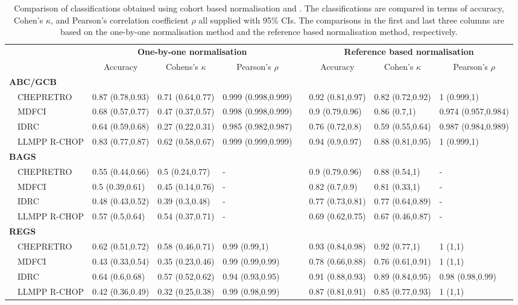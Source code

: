 
\begin{table}[!tbp]
\scriptsize
\tabcolsep=0.11cm
\caption{Comparison of classifications obtained using cohort based normalisation and \hemaClass{}.
The classifications are compared in terms of accuracy, Cohen's $\kappa$, and Pearson's correlation coefficient $\rho$ all supplied with 95\% CIs.
The comparisons in the first and last three columns are based on the one-by-one normalisation method and the reference based normalisation method, respectively.\label{tab:classALL}}
\begin{center}
\begin{tabular}{llllclll}
\hline\hline
\multicolumn{1}{l}{\bfseries }&\multicolumn{3}{c}{\bfseries One-by-one normalisation}&\multicolumn{1}{c}{\bfseries }&\multicolumn{3}{c}{\bfseries Reference based normalisation}\tabularnewline
\cline{2-4} \cline{6-8}
\multicolumn{1}{l}{}&\multicolumn{1}{c}{Accuracy}&\multicolumn{1}{c}{Cohens's $\kappa$}&\multicolumn{1}{c}{Pearson's $\rho$}&\multicolumn{1}{c}{}&\multicolumn{1}{c}{Accuracy}&\multicolumn{1}{c}{Cohen's $\kappa$}&\multicolumn{1}{c}{Pearson's $\rho$}\tabularnewline
\hline
{\bfseries ABC/GCB}&&&&&&&\tabularnewline
~~CHEPRETRO&0.87 (0.78,0.93)&0.71 (0.64,0.77)&0.999 (0.998,0.999)&&0.92 (0.81,0.97)&0.82 (0.72,0.92)&1 (0.999,1)\tabularnewline
~~MDFCI&0.68 (0.57,0.77)&0.47 (0.37,0.57)&0.998 (0.998,0.999)&&0.9 (0.79,0.96)&0.86 (0.7,1)&0.974 (0.957,0.984)\tabularnewline
~~IDRC&0.64 (0.59,0.68)&0.27 (0.22,0.31)&0.985 (0.982,0.987)&&0.76 (0.72,0.8)&0.59 (0.55,0.64)&0.987 (0.984,0.989)\tabularnewline
~~LLMPP R-CHOP&0.83 (0.77,0.87)&0.62 (0.58,0.67)&0.999 (0.999,0.999)&&0.94 (0.9,0.97)&0.88 (0.81,0.95)&1 (0.999,1)\tabularnewline
\hline
{\bfseries BAGS}&&&&&&&\tabularnewline
~~CHEPRETRO&0.55 (0.44,0.66)&0.5 (0.24,0.77)&-&&0.9 (0.79,0.96)&0.88 (0.54,1)&-\tabularnewline
~~MDFCI&0.5 (0.39,0.61)&0.45 (0.14,0.76)&-&&0.82 (0.7,0.9)&0.81 (0.33,1)&-\tabularnewline
~~IDRC&0.48 (0.43,0.52)&0.39 (0.3,0.48)&-&&0.77 (0.73,0.81)&0.77 (0.64,0.89)&-\tabularnewline
~~LLMPP R-CHOP&0.57 (0.5,0.64)&0.54 (0.37,0.71)&-&&0.69 (0.62,0.75)&0.67 (0.46,0.87)&-\tabularnewline
\hline
{\bfseries REGS}&&&&&&&\tabularnewline
~~CHEPRETRO&0.62 (0.51,0.72)&0.58 (0.46,0.71)&0.99 (0.99,1)&&0.93 (0.84,0.98)&0.92 (0.77,1)&1 (1,1)\tabularnewline
~~MDFCI&0.43 (0.33,0.54)&0.35 (0.23,0.46)&0.99 (0.99,0.99)&&0.78 (0.66,0.88)&0.76 (0.61,0.91)&1 (1,1)\tabularnewline
~~IDRC&0.64 (0.6,0.68)&0.57 (0.52,0.62)&0.94 (0.93,0.95)&&0.91 (0.88,0.93)&0.89 (0.84,0.95)&0.98 (0.98,0.99)\tabularnewline
~~LLMPP R-CHOP&0.42 (0.36,0.49)&0.32 (0.25,0.38)&0.99 (0.98,0.99)&&0.87 (0.81,0.91)&0.85 (0.77,0.93)&1 (1,1)\tabularnewline
\hline
\end{tabular}
\end{center}
\end{table}
